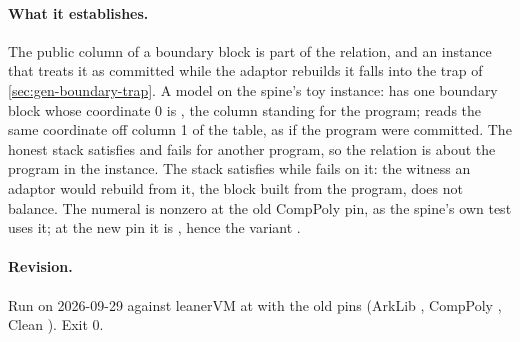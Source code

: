 \paragraph{What it establishes.} The public column of a boundary block is part of the
relation, and an instance that treats it as committed while the adaptor rebuilds it falls into
the trap of \cref{sec:gen-boundary-trap}. A model on the spine's toy instance:  has
one boundary block whose coordinate 0 is , the column  standing for
the program;  reads the same coordinate off column 1 of the table, as if the
program were committed. The honest stack satisfies  and fails
 for another program, so the relation is about the program in the instance. The
stack  satisfies  while 
fails on it: the witness an adaptor would rebuild from it, the block built from the program, does
not balance. The numeral  is nonzero at the old CompPoly pin, as the spine's own test
 uses it; at the new pin it is , hence the variant
.

\paragraph{Revision.} Run on 2026-09-29 against leanerVM  at  with the old pins (ArkLib , CompPoly , Clean ). Exit 0.

